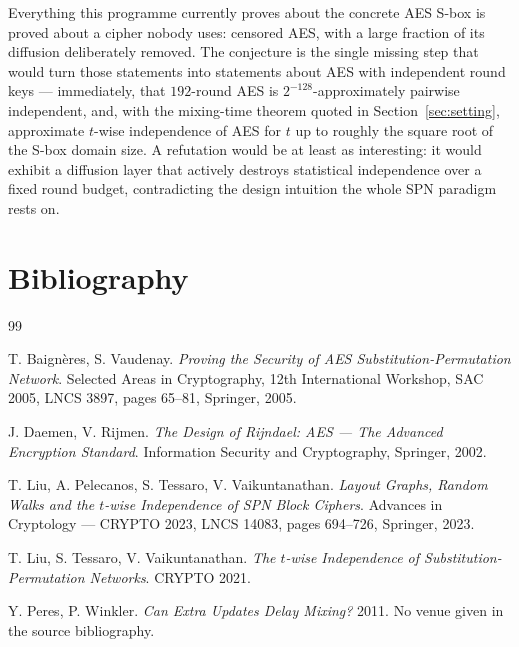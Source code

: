 \documentclass{aicr-conjecture}
\begin{document}
\begin{remark}\label{rem:consequence}
Everything this programme currently proves about the concrete AES S-box is
proved about a cipher nobody uses: censored AES, with a large fraction of
its diffusion deliberately removed. The conjecture is the single missing
step that would turn those statements into statements about AES with
independent round keys --- immediately, that $192$-round AES is
$2^{-128}$-approximately pairwise independent, and, with the mixing-time
theorem quoted in Section~\ref{sec:setting}, approximate $t$-wise
independence of AES for $t$ up to roughly the square root of the S-box
domain size. A refutation would be at least as interesting: it would
exhibit a diffusion layer that actively destroys statistical independence
over a fixed round budget, contradicting the design intuition the whole SPN
paradigm rests on.
\end{remark}

\section{Bibliography}

\begin{aicrbibliography}{99}

T. Baign\`eres, S. Vaudenay.
\emph{Proving the Security of AES Substitution-Permutation Network}.
Selected Areas in Cryptography, 12th International Workshop, SAC 2005,
LNCS 3897, pages 65--81, Springer, 2005.

J. Daemen, V. Rijmen.
\emph{The Design of Rijndael: AES --- The Advanced Encryption Standard}.
Information Security and Cryptography, Springer, 2002.

T. Liu, A. Pelecanos, S. Tessaro, V. Vaikuntanathan.
\emph{Layout Graphs, Random Walks and the $t$-wise Independence of SPN
Block Ciphers}.
Advances in Cryptology --- CRYPTO 2023, LNCS 14083, pages 694--726,
Springer, 2023.

T. Liu, S. Tessaro, V. Vaikuntanathan.
\emph{The $t$-wise Independence of Substitution-Permutation Networks}.
CRYPTO 2021.

Y. Peres, P. Winkler.
\emph{Can Extra Updates Delay Mixing?}
2011. No venue given in the source bibliography.

\end{aicrbibliography}
\end{document}
